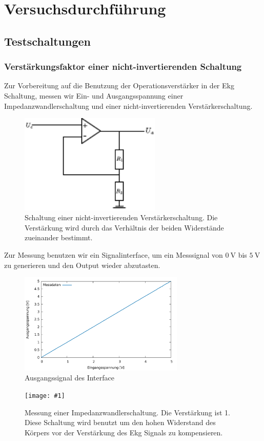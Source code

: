 \newcommand{\mess}[3] {
\begin{figure}[H]
	\centering
	\texttt{[image: \#1]}
	\caption{#2}
	\label{#3}
\end{figure} }
\newcommand{\refabb}[1]{(siehe Abb. \ref{#1})}

\chapter{Versuchsdurchführung}
\section{Testschaltungen}
\subsection{Verstärkungsfaktor einer nicht-invertierenden Schaltung}
Zur Vorbereitung auf die Benutzung der Operationsverstärker in der Ekg
Schaltung, messen wir Ein- und Ausgangsspannung einer Impedanzwandlerschaltung
und einer nicht-invertierenden Verstärkerschaltung.\\
\begin{figure}[htb]
    \centering
    \includegraphics[width=0.6\textwidth]{Abb/nicht-inv.pdf}
    \caption{Schaltung einer nicht-invertierenden Verstärkerschaltung. Die
Verstärkung wird durch das Verhältnis der beiden Widerstände zueinander
bestimmt.}
    \label{ninv}
\end{figure}

Zur Messung benutzen wir ein Signalinterface, um ein Messsignal von
$\SI{0}{\volt}$ bis $\SI{5}{\volt}$ zu generieren und den Output wieder
abzutasten. \\
	\begin{figure}
		\centering
		\includegraphics[width=0.7\textwidth]{Mess/Op/ausgangssignal.pdf}
		\caption{Ausgangssignal des Interface}
	\end{figure}
\mess{Mess/Op/faktor1.pdf}{Messung einer Impedanzwandlerschaltung. Die
						   Verstärkung ist 1. Diese Schaltung wird benutzt um den hohen Widerstand des
						   Körpers vor der Verstärkung des Ekg Signals zu kompensieren.}{imp}

